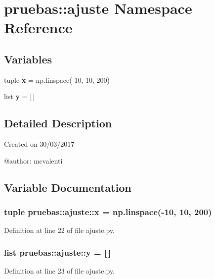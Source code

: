 \section{pruebas\-:\-:ajuste \-Namespace \-Reference}
\label{namespacepruebas_1_1ajuste}
\subsection*{\-Variables}
\begin{DoxyCompactItemize}
\item 
tuple {\bf x} = np.\-linspace(-\/10, 10, 200)
\item 
list {\bf y} = [$\,$]
\end{DoxyCompactItemize}


\subsection{\-Detailed \-Description}
\begin{DoxyVerb}
Created on 30/03/2017

@author: mcvalenti
\end{DoxyVerb}
 

\subsection{\-Variable \-Documentation}
\subsubsection[{x}]{\setlength{\rightskip}{0pt plus 5cm}tuple {\bf pruebas\-::ajuste\-::x} = np.\-linspace(-\/10, 10, 200)}\label{namespacepruebas_1_1ajuste_aea7418b9d1a4ab72a4bed3ad832cfdd6}


\-Definition at line 22 of file ajuste.\-py.

\subsubsection[{y}]{\setlength{\rightskip}{0pt plus 5cm}list {\bf pruebas\-::ajuste\-::y} = [$\,$]}\label{namespacepruebas_1_1ajuste_ad9e1e73a7a0e01e6b5a9c8e04aaa8396}


\-Definition at line 23 of file ajuste.\-py.

